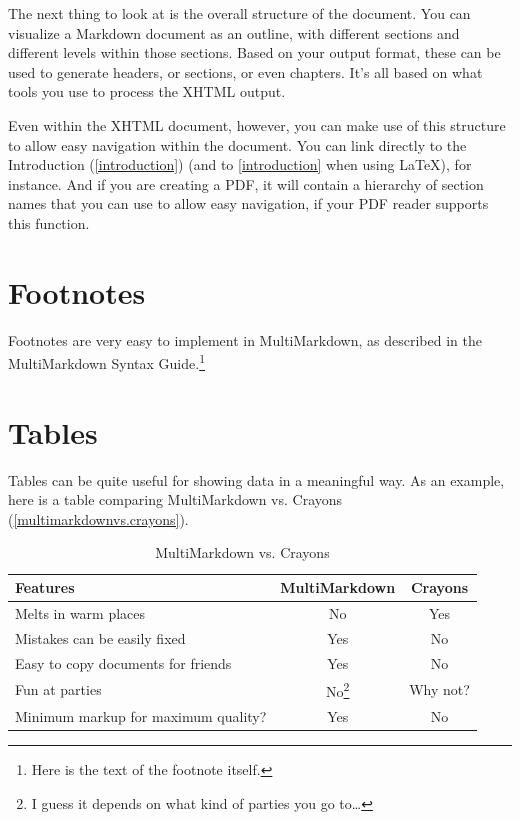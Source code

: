 \documentclass[oneside,article]{memoir}
\begin{document}
The next thing to look at is the overall structure of the document. You can
visualize a Markdown document as an outline, with different sections and
different levels within those sections. Based on your output format, these can
be used to generate headers, or sections, or even chapters. It's all based on
what tools you use to process the XHTML output.


Even within the XHTML document, however, you can make use of this structure to
allow easy navigation within the document. You can link directly to the
Introduction (\autoref{introduction}) (and to \autoref{introduction} when using LaTeX), for instance. And if you are creating a PDF, it will contain
a hierarchy of section names that you can use to allow easy navigation, if
your PDF reader supports this function.


\section{Footnotes}
\label{footnotes}

Footnotes are very easy to implement in MultiMarkdown, as described in the
MultiMarkdown Syntax Guide.\footnote{Here is the text of the footnote itself.}


\section{Tables}
\label{tables}

Tables can be quite useful for showing data in a meaningful way. As an
example, here is a table comparing MultiMarkdown vs. Crayons (\autoref{multimarkdownvs.crayons}).


\begin{table}[htbp]
\begin{minipage}{\linewidth}
\setlength{\tymax}{0.5\linewidth}
\centering
\small
\caption{MultiMarkdown vs. Crayons}
\label{multimarkdownvs.crayons}
\begin{tabulary}{\linewidth}{@{}lcc@{}} \\ \toprule 
Features&MultiMarkdown&Crayons \\\midrule
Melts in warm places&No&Yes \\
Mistakes can be easily fixed&Yes&No \\
Easy to copy documents for friends&Yes&No \\
Fun at parties&No\footnote{I guess it depends on what kind of parties you go to{\ldots}}&Why not? \\

		\bottomrule
	Minimum markup for maximum quality?&Yes&No \\

		\bottomrule
	\end{tabulary}
\end{minipage}
\end{table}
\end{document}
